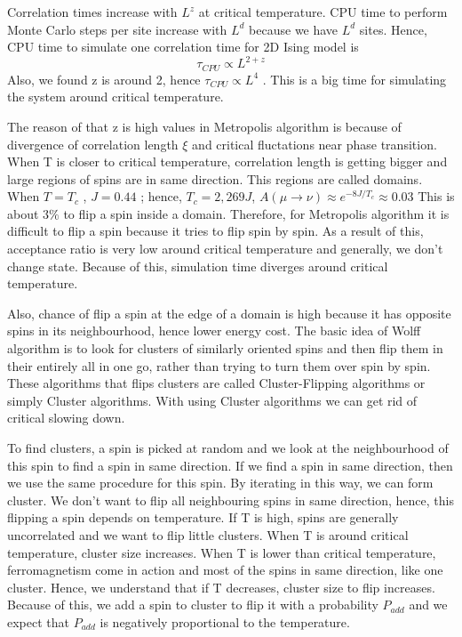 \documentclass[12pt,fleqn]{report}
\begin{document}
Correlation times increase with $L^z$ at critical temperature. CPU time to 
perform Monte Carlo steps per site increase with $L^d$ because we have 
$L^d$ sites. Hence, CPU time to simulate one correlation time for 2D Ising 
model is
\begin{equation}
\tau_{CPU} \propto L^{2+z}
\end{equation}
Also, we found z is around 2, hence $\tau_{CPU} \propto L^{4}$ . This is a 
big time for simulating the system around critical temperature. 

The reason of that z is high values in Metropolis algorithm is because of 
divergence of correlation length $\xi$ and critical fluctations near phase 
transition. When T is closer to critical temperature, correlation length is 
getting bigger and large regions of spins are in same direction. This 
regions are called domains. When $T = T_c$ , $J = 0.44 $ ; hence, $T_c = 
2,269 J $, $A(\mu \rightarrow \nu) \approx e^{-8J/T_c} \approx 0.03 $ 
This is about $ 3 \% $ to flip a spin inside a domain. Therefore, for  
Metropolis algorithm it is difficult to flip a spin because it tries to flip spin 
by spin. As a result of this, acceptance ratio is very low around critical 
temperature and generally, we don't change state. Because of this, 
simulation time diverges around critical temperature.

Also, chance of flip a spin at the edge of a domain is high because it has 
opposite spins in its neighbourhood, hence lower energy cost. The basic 
idea of Wolff algorithm is to look for clusters of similarly oriented spins and 
then flip them in their entirely all in one go, rather than trying to turn them 
over spin by spin.\cite[p. 92]{newman}
These algorithms that flips clusters are called Cluster-Flipping algorithms 
or simply Cluster algorithms.  With using Cluster algorithms we can get rid 
of critical slowing down. 

To find clusters, a spin is picked at random and we look at the 
neighbourhood of this spin to find a spin in same direction. If we find a 
spin in same direction, then we use the same procedure for this spin. By 
iterating in this way, we can form cluster. We don't want to flip all 
neighbouring spins in same direction, hence, this flipping a spin depends 
on temperature. If T is high, spins are generally uncorrelated and we want 
to flip little clusters. When T is around critical temperature, cluster size 
increases. When T is lower than critical temperature, ferromagnetism come 
in action and most of the spins in same direction, like one cluster. Hence, 
we understand that if T decreases, cluster size to flip increases. Because of 
this, we add a spin to cluster to flip it with a probability $P_{add}$ and we 
expect that $P_{add}$ is negatively proportional to the temperature.
\end{document}
